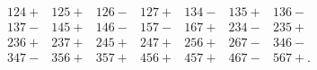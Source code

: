 \begin{equation}
\begin{array}{ccccccc}
124+ & 125+ & 126- & 127+ & 134- & 135+ & 136- \\ 
137- & 145+ & 146- & 157- & 167+ & 234- & 235+ \\ 
236+ & 237+ & 245+ & 247+ & 256+ & 267- & 346- \\ 
347- & 356+ & 357+ & 456+ & 457+ & 467- & 567+.
\end{array}
\label{17}
\end{equation}

